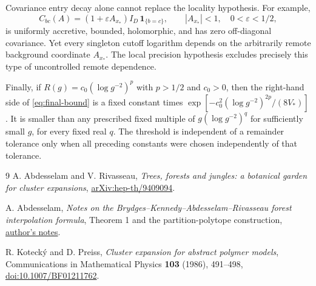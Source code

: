 \documentclass[11pt]{article}
\newcommand{\one}{\mathbf 1}
\begin{document}
Covariance entry decay alone cannot replace the locality hypothesis.
For example,
\[
 C_{bc}(A)=(1+\varepsilon A_{x_*})I_D\,\one_{\{b=c\}},
 \qquad |A_{x_*}|<1,\quad 0<\varepsilon<1/2,
\]
is uniformly accretive, bounded, holomorphic, and has zero
off-diagonal covariance. Yet every singleton cutoff logarithm
depends on the arbitrarily remote background coordinate $A_{x_*}$.
The local precision hypothesis excludes precisely this type of
uncontrolled remote dependence.

Finally, if $R(g)=c_0(\log g^{-2})^p$ with $p>1/2$ and $c_0>0$,
then the right-hand side of \eqref{eq:final-bound} is a fixed
constant times
$\exp[-c_0^2(\log g^{-2})^{2p}/(8V_*)]$.
It is smaller than any prescribed fixed multiple of
$g(\log g^{-2})^q$ for sufficiently small $g$, for every fixed
real $q$. The threshold is independent of a remainder tolerance
only when all preceding constants were chosen independently of
that tolerance.

\begin{thebibliography}{9}
A. Abdesselam and V. Rivasseau,
\emph{Trees, forests and jungles: a botanical garden for cluster expansions},
\href{https://arxiv.org/abs/hep-th/9409094}{arXiv:hep-th/9409094}.

A. Abdesselam,
\emph{Notes on the Brydges--Kennedy--Abdesselam--Rivasseau forest
interpolation formula}, Theorem 1 and the partition-polytope construction,
\href{https://mabdesselam.github.io/BKAR.pdf}{author's notes}.

R. Koteck\'y and D. Preiss,
\emph{Cluster expansion for abstract polymer models},
Communications in Mathematical Physics \textbf{103} (1986), 491--498,
\href{https://doi.org/10.1007/BF01211762}{doi:10.1007/BF01211762}.
\end{thebibliography}
\end{document}
